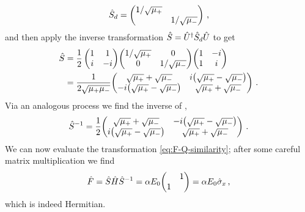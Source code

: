         \begin{equation*}
            \hS_d = \pmqty{\dmat{1/\sqrt{\mu_{+}}, 1/\sqrt{\mu_{-}}}}
            \mycomma
        \end{equation*}
        and then apply the inverse transformation $\hat{S} = \hat{U}^\dag \hat{S}_d \hat{U}$ to get
        \begin{align*}
            \hS 
            &= \frac{1}{2}\pmqty{1 & 1 \\ i & -i} \!\pmqty{\dmat[0]{1/\sqrt{\mu_{+}}, 1/\sqrt{\mu_{-}}}} \!\pmqty{1 & -i \\ 1 & i} \\
            &= \frac{1}{2\sqrt{\mu_{+}\mu_{-}}} \!\pmqty{\admat[\sqrt{\mu_{+}} + \sqrt{\mu_{-}}]{i\pqty{\sqrt{\mu_{+}} - \sqrt{\mu_{-}}} , -i\pqty{\sqrt{\mu_{+}} - \sqrt{\mu_{-}}}}}
            \myperiod
        \end{align*}
        Via an analogous process we find the inverse of \hS,
        \begin{align*}
            \hS^{-1} = \frac{1}{2} \!\pmqty{\admat[\sqrt{\mu_{+}} + \sqrt{\mu_{-}}]{-i\pqty{\sqrt{\mu_{+}} - \sqrt{\mu_{-}}} , i\pqty{\sqrt{\mu_{+}} - \sqrt{\mu_{-}}}}}
            \myperiod
        \end{align*}
        We can now evaluate the transformation \eqref{eq:F-Q-similarity}; after some careful matrix multiplication we find 
        \begin{equation*}
            \hF = \hS \hH \hS^{-1}
            = \alpha E_0 \!\pmqty{\admat{1,1}}
            = \alpha E_0 \togglehat{\sigma}_x
            \mycomma
        \end{equation*}
        which is indeed Hermitian.
        
